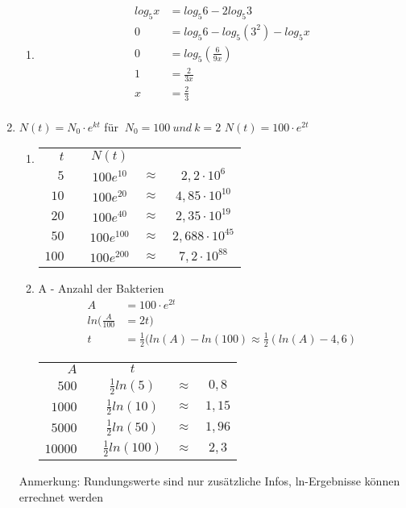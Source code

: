 \begin{enumerate}
\begin{enumerate}
  \item
  \begin{align*} 
  log_5 x&=log_5 6-2log_5 3 \\
  0 &=log_5 6 -log_5 (3^2) - log_5 x \\
  0 &= log_5(\frac{6}{9x})\\
  1 &= \frac{2}{3x}\\
  x &= \frac{2}{3}\\
  \end{align*} 

  \end{enumerate}
  
  
  \item %
  $N(t)=N_0 \cdot e^{kt}$ \newline
  f\"ur $\ N_0=100 \ und \ k=2 $\newline
  $N(t)=100\cdot e^{2t}$ \newline
  \begin{enumerate}
	\item 
	\begin{tabular}{rcccc}
	$t$ & & $ N(t)$ & & \\
	$5$ & & $100e^{10}$ & $\approx$ & $2,2 \cdot10^6$\\
	$10$ & & $100e^{20}$ & $\approx$ & $4,85 \cdot10^{10}$\\
	$20$ & & $100e^{40}$ & $\approx$ & $2,35 \cdot10^{19}$\\
	$50$ & & $100e^{100}$ & $\approx$ & $2,688 \cdot10^{45}$\\
	$100$ & & $100e^{200}$ & $\approx$ & $7,2 \cdot10^{88}$\\
	\end{tabular}
	
	
	\item
	A - Anzahl der Bakterien \newline
	\begin{align*}
	A &= 100 \cdot e^{2t}\\
	ln(\frac{A}{100}&=2t)\\
	t&= \frac{1}{2}(ln(A)- ln(100) \approx \frac{1}{2}(ln(A)-4,6)
	\end{align*}
	\begin{tabular}{rcccc}
	$A$ & & $ t$ & & \\
	$500$ & & $\frac{1}{2} ln(5)$ & $\approx$ & $0,8$\\
	$1000$ & & $\frac{1}{2} ln(10)$ & $\approx$ & $1,15$\\
	$5000$ & & $\frac{1}{2} ln(50)$ & $\approx$ & $1,96$\\
	$10000$ & & $\frac{1}{2} ln(100)$ & $\approx$ & $2,3$\\
	\end{tabular}
		\end{enumerate}
		Anmerkung: Rundungswerte sind nur zusätzliche Infos, ln-Ergebnisse können errechnet werden



\end{enumerate}
